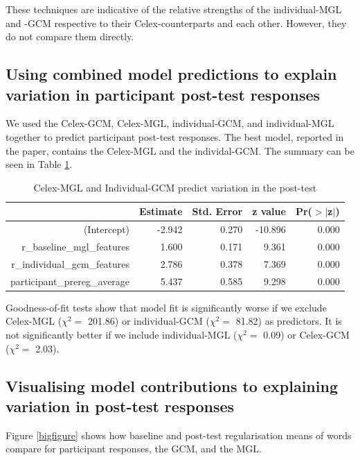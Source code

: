 \documentclass[12pt]{article}
\begin{document}
These techniques are indicative of the relative strengths of the individual-MGL and -GCM respective to their {\sc Celex}-counterparts and each other. However, they do not compare them directly. 

\subsection{Using combined model predictions to explain variation in participant post-test responses}


We used the {\sc Celex}-GCM, {\sc Celex}-MGL, individual-GCM, and individual-MGL together to predict participant post-test responses. The best model, reported in the paper, contains the {\sc Celex}-MGL and the individal-GCM. The summary can be seen in Table \ref{comp3}. 


\begin{table}[ht]
\centering
\begin{tabular}{rrrrr}
  \hline
 & Estimate & Std. Error & z value & Pr($>$$|$z$|$) \\ 
  \hline
(Intercept) & -2.942 & 0.270 & -10.896 & 0.000 \\ 
  r\_baseline\_mgl\_features & 1.600 & 0.171 & 9.361 & 0.000 \\ 
  r\_individual\_gcm\_features & 2.786 & 0.378 & 7.369 & 0.000 \\ 
  participant\_prereg\_average & 5.437 & 0.585 & 9.298 & 0.000 \\ 
   \hline
\end{tabular}
\caption{Celex-MGL and Individual-GCM predict variation in the post-test} 
\label{comp3}
\end{table}
Goodness-of-fit tests show that model fit is significantly worse if we exclude {\sc Celex}-MGL ($\chi^2 = $ 201.86) or individual-GCM ($\chi^2 = $ 81.82) as predictors. It is not significantly better if we include individual-MGL ($\chi^2 = $ 0.09) or {\sc Celex}-GCM ($\chi^2 = $ 2.03).

\subsection{Visualising model contributions to explaining variation in post-test responses}

Figure \ref{bigfigure} shows how baseline and post-test regularisation means of words compare for participant responses, the GCM, and the MGL.
\end{document}
